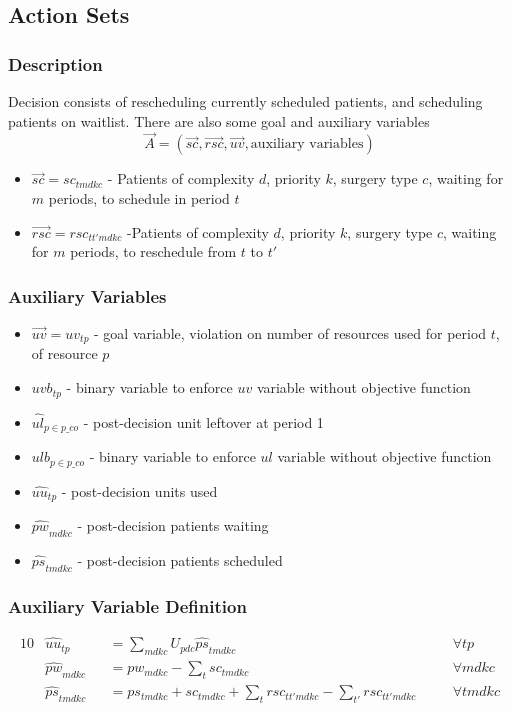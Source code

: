 \subsection{Action Sets}
\subsubsection{Description}
Decision consists of rescheduling currently scheduled patients, and scheduling patients on waitlist. There are also some goal and auxiliary variables
\[  \vec{A} = (\vec{sc}, \vec{rsc}, \vec{uv}, \text{auxiliary variables}) \] 
\begin{itemize}
	\item $\vec{sc} = sc_{tmdkc}$ - Patients of complexity $d$, priority $k$,  surgery type $c$, waiting for $m$ periods, to schedule in period $t$
	\item $\vec{rsc} = rsc_{tt'mdkc}$ -Patients of complexity $d$, priority $k$, surgery type $c$, waiting for $m$ periods, to reschedule from $t$ to $t'$
\end{itemize}

\subsubsection{Auxiliary Variables}
\begin{itemize}
	\item $\vec{uv} = uv_{tp}$ - goal variable, violation on number of resources used for period $t$, of resource $p$
	\item $uvb_{tp}$ - binary variable to enforce $uv$ variable without objective function
	\item $\hat{ul}_{p \in p\_co}$ - post-decision unit leftover at period 1
	\item $ulb_{p \in p\_co}$ - binary variable to enforce $ul$ variable without objective function
	\item $\hat{uu}_{tp}$ - post-decision units used
	\item $\hat{pw}_{mdkc}$ - post-decision patients waiting
	\item $\hat{ps}_{tmdkc}$ - post-decision patients scheduled
\end{itemize}
\subsubsection{Auxiliary Variable Definition}
\label{auxiliary constraints}
\begin{alignat}{10}
	& \hat{uu}_{tp} 
	&& =  \sum_{mdkc} U_{pdc} \hat{ps}_{tmdkc} \quad
	&& \forall tp \\ 
	& \hat{pw}_{mdkc} 
	&& = pw_{mdkc} - \sum_{t} sc_{tmdkc} \quad 
	&& \forall mdkc \\ 
	& \hat{ps}_{tmdkc} 
	&& = ps_{tmdkc} + sc_{tmdkc} + 
	\sum_{t} rsc_{tt'mdkc} - \sum_{t'} rsc_{tt'mdkc} \quad 
	&& \forall tmdkc
\end{alignat}

